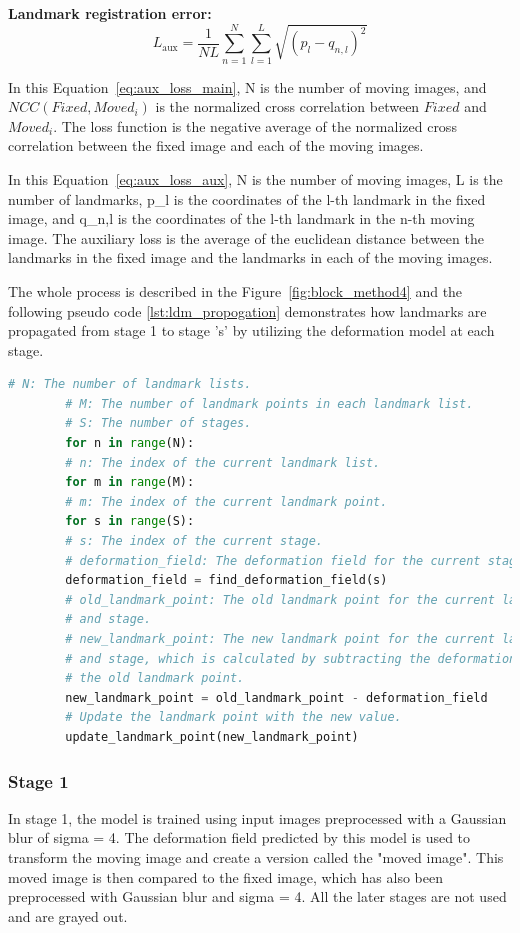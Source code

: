 \documentclass{report}
\begin{document}
	\textbf{Landmark registration error:}
	\begin{equation}\label{eq:aux_loss_aux}
		L_\text{aux} = \frac{1}{NL} \sum_{n=1}^N \sum_{l=1}^L \sqrt{(p_l - q_{n,l})^2}
	\end{equation}
	
	In this Equation~\ref{eq:aux_loss_main}, N is the number of moving images, and $NCC(Fixed, Moved_i)$ is the normalized cross correlation between $Fixed$ and $Moved_i$. The loss function is the negative average of the normalized cross correlation between the fixed image and each of the moving images.
	
	In this Equation~\ref{eq:aux_loss_aux}, N is the number of moving images, L is the number of landmarks, p\_l is the coordinates of the l-th landmark in the fixed image, and q\_{n,l} is the coordinates of the l-th landmark in the n-th moving image. The auxiliary loss is the average of the euclidean distance between the landmarks in the fixed image and the landmarks in each of the moving images.
	
    The whole process is described in the Figure~\ref{fig:block_method4} and the following pseudo code \ref{lst:ldm_propogation} demonstrates how landmarks are propagated from stage 1 to stage 's' by utilizing the deformation model at each stage.
    
    \begin{lstlisting}[language=Python, label=lst:ldm_propogation, caption=Pseudo code to show how the landmarks are propogated from stage to stage.]
    	# N: The number of landmark lists.
    	# M: The number of landmark points in each landmark list.
    	# S: The number of stages.
    	for n in range(N):
    	# n: The index of the current landmark list.
    	for m in range(M):
    	# m: The index of the current landmark point.
    	for s in range(S):
    	# s: The index of the current stage.
    	# deformation_field: The deformation field for the current stage.
    	deformation_field = find_deformation_field(s)
    	# old_landmark_point: The old landmark point for the current landmark point
    	# and stage.
    	# new_landmark_point: The new landmark point for the current landmark point
    	# and stage, which is calculated by subtracting the deformation field from
    	# the old landmark point.
    	new_landmark_point = old_landmark_point - deformation_field
    	# Update the landmark point with the new value.
    	update_landmark_point(new_landmark_point)
    \end{lstlisting}

	\subsubsection{Stage 1}
	In stage 1, the model is trained using input images preprocessed with a Gaussian blur of sigma = 4. The deformation field predicted by this model is used to transform the moving image and create a version called the "moved image". This moved image is then compared to the fixed image, which has also been preprocessed with Gaussian blur and sigma = 4. All the later stages are not used and are grayed out.
\end{document}
